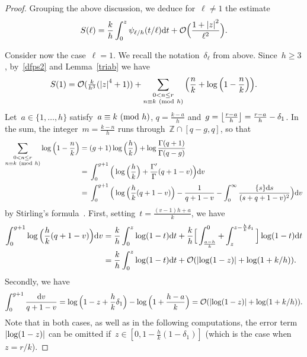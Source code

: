\documentclass[11pt]{amsart}
\newcommand{\Z}{\mathbb{Z}}
\renewcommand{\mod}[1]{~\pr{\textnormal{mod}~#1}}
\theoremstyle{definition}
\newcommand{\ssum}[1]{\sum_{\substack{#1}}}
\newcommand{\pr}[1]{\mathchoice{\left( #1\right)}{(#1)}{(#1)}{(#1)}}
\newcommand{\floor}[1]{{\left\lfloor {#1} \right\rfloor}}
\newcommand{\df}{\mathrm{d}}
\newcommand{\Oh}{\mathcal{O}}
\newcommand{\1}{{\mathbf 1}}
\newcommand{\abs}[1]{\left|#1\right|}
\let\originalleft\left
\let\originalright\right
\renewcommand{\left}{\mathopen{}\mathclose\bgroup\originalleft}
\renewcommand{\right}{\aftergroup\egroup\originalright}
\numberwithin{equation}{section}
\begin{document}
\begin{proof}
  Grouping the above discussion, we deduce for~$\ell\neq 1$ the estimate
  \begin{equation}
    S(\ell) = \frac{k}{h} \int_0^z \psi_{\ell/h}(t/\ell)\df t + \Oh\Big(\frac{1+\abs{z}^2}{\ell^2}\Big).\label{eq:estim-Sell-neq1}
  \end{equation}

  Consider now the case~$\ell = 1$. We recall the notation~$\delta_\ell$ from above. Since~$h\geq 3$, by~\eqref{dfps2} and Lemma~\ref{triab} we have
  \begin{equation}
    S(1) = \Oh(\tfrac{k}{h^3}(\abs{z}^4+1)) + \ssum{0<n\leq r \\ n\equiv k \mod{h}} \Big( \frac nk + \log\Big(1 - \frac nk\Big)\Big).\label{eq:sumcotan-ell-1}
  \end{equation}
  Let~$a\in\{1, \dotsc, h\}$ satisfy~$a\equiv k\mod{h}$, $q = \frac{k-a}h$ and~$g = \floor{\frac{r-a}h} = \frac{r-a}h - \delta_1$. In the sum, the integer~$m = \frac{k-n}{h}$ runs through~$\Z\cap[q-g, q]$, so that
  \begin{align*}
    \ssum{0<n\leq r \\ n\equiv k \mod{h}} \log\Big(1 - \frac nk\Big) = {}& (g+1)\log\Big(\frac hk\Big) + \log\frac{\Gamma(q+1)}{\Gamma(q-g)} \\[-1em]
    = {}& \int_0^{g+1}\Big(\log\Big(\frac hk\Big) + \frac{\Gamma'}{\Gamma}(q+1-v)\Big)\df v \\
    = {}& \int_0^{g+1}\Big(\log\Big(\frac hk(q+1-v)\Big) - \frac1{q+1-v} - \int_0^\infty \frac{\{s\}\df s}{(s+q+1-v)^2}\Big)\df v
  \end{align*}
  by Stirling's formula~\cite[Theorem~II.0.12]{Tenenbaum2015a}. First, setting~$t = \frac{(v-1)h+a}k$, we have
  \begin{align*}
    \int_0^{g+1}\log\Big(\frac hk(q+1-v)\Big)\df v = {}& \frac kh\int_0^z \log(1-t)\df t + \frac kh\Big[\int_{\frac{a-h}{k}}^0 + \int^{z-\frac hk \delta_1}_z\Big] \log(1-t)\df t \\
    = {}& \frac kh\int_0^z \log(1-t)\df t + \Oh(\abs{\log(1-z)} + \log(1+k/h)).
  \end{align*}
  Secondly, we have
  \begin{align*}
    \int_0^{g+1} \frac{\df v}{q+1-v} = \log\Big(1-z+\frac{h}k\delta_1\Big) - \log\Big( 1 + \frac{h-a}k\Big) = \Oh(\abs{\log(1-z)} + \log(1+k/h)).
  \end{align*}
  Note that in both cases, as well as in the following computations, the error term~$\abs{\log(1-z)}$ can be omitted if~$z \in [0, 1 - \frac hk(1-\delta_1)]$ (which is the case when~$z=r/k$).

\end{proof}
\end{document}

